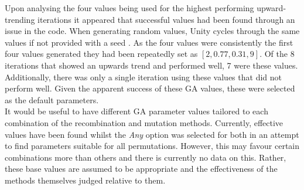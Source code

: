 \documentclass{article}
\begin{document}
Upon analysing the four values being used for the highest performing upward-trending iterations it appeared that successful values had been found through an issue in the code. When generating random values, Unity cycles through the same values if not provided with a seed . As the four values were consistently the first four values generated they had been repeatedly set as $[2, 0.77, 0.31, 9]$. Of the 8 iterations that showed an upwards trend and performed well, 7 were these values. Additionally, there was only a single iteration using these values that did not perform well. Given the apparent success of these GA values, these were selected as the default parameters. \\
It would be useful to have different GA parameter values tailored to each combination of the recombination and mutation methods. Currently, effective values have been found whilst the \textit{Any} option was selected for both in an attempt to find parameters suitable for all permutations. However, this may favour certain combinations more than others and there is currently no data on this. Rather, these base values are assumed to be appropriate and the effectiveness of the methods themselves judged relative to them. \\
\end{document}
